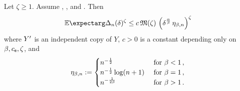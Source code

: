 %
\begin{lemma}\label{lmm:weak:close}	
	Let $\zeta \geq 1$. Assume , , and .
	Then
	\begin{equation*}
		\Ex{\Delta_n(\delta)^\zeta} 
		\leq c\, \mf M(\zeta)\, \br{\delta^{\frac\alpha\beta}\, \eta_{\beta,n}}^\zeta
	\end{equation*}
	where $Y^\prime$ is an independent copy of $Y$, $c > 0$ is a constant depending only on $\beta, c_{\mathsf{e}}, \zeta$, and
	\begin{equation*}
		\eta_{\beta,n} := 
		\begin{cases} 
			n^{-\frac12} & \text{ for }\beta < 1\, ,\\
			n^{-\frac12} \log(n+1) & \text{ for } \beta = 1\, ,\\
			n^{-\frac1{2\beta}} & \text{ for } \beta > 1\, .
		\end{cases} 
	\end{equation*}
\end{lemma}
%
